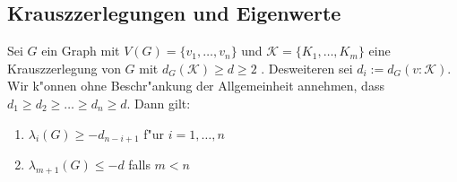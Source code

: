 \subsection{Krauszzerlegungen und Eigenwerte}

\begin{theorem}
  \label{thm:KrauszEigenwerte}
  Sei $G$ ein Graph mit $V(G)=\{v_1,\dots,v_n\}$ und $\mathcal K=\{K_1,\dots,K_m\}$ eine Krauszzerlegung von $G$ mit $d_G(\mathcal K) \geq d \geq 2$ . Desweiteren sei $d_i := d_G(v:\mathcal K)$. 
  Wir k"onnen ohne Beschr"ankung der Allgemeinheit annehmen, dass $d_1\geq d_2 \geq \dots \geq d_n \geq d$.
  Dann gilt: 
  \begin{enumerate}[label=(\alph*)]
    \item $\lambda_i(G) \geq -d_{n-i+1}$ f"ur $i = 1, \dots , n$
    \item $\lambda_{m+1}(G) \leq -d$ falls $m < n$
  \end{enumerate}
\end{theorem}
